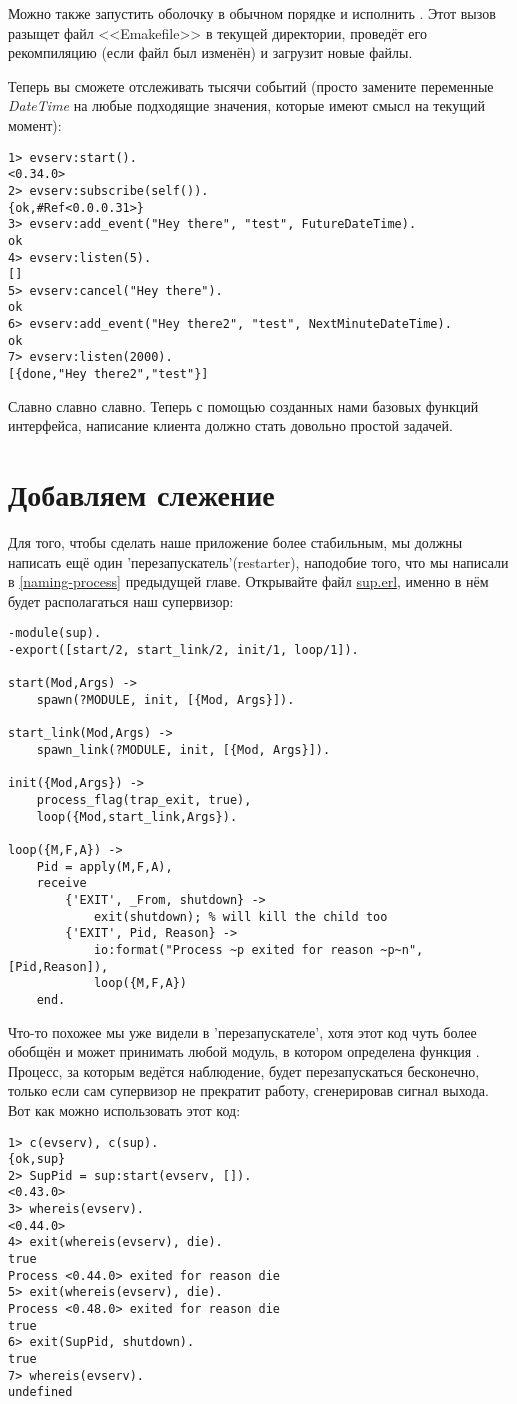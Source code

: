Можно также запустить оболочку в обычном порядке и исполнить .
Этот вызов разыщет файл <<Emakefile>> в текущей директории, проведёт его рекомпиляцию (если файл был изменён) и загрузит новые файлы.

Теперь вы сможете отслеживать тысячи событий (просто замените переменные \emph{DateTime} на любые подходящие значения, которые имеют смысл на текущий момент): 
\begin{lstlisting}[style=erlang]
1> evserv:start().
<0.34.0>
2> evserv:subscribe(self()).
{ok,#Ref<0.0.0.31>}
3> evserv:add_event("Hey there", "test", FutureDateTime).
ok
4> evserv:listen(5).
[]
5> evserv:cancel("Hey there").
ok
6> evserv:add_event("Hey there2", "test", NextMinuteDateTime).
ok
7> evserv:listen(2000).
[{done,"Hey there2","test"}]
\end{lstlisting}

Славно славно славно.
Теперь с помощью созданных нами базовых функций интерфейса, написание клиента должно стать довольно простой задачей.
\section{Добавляем слежение}
\label{adding-supervision}
Для того, чтобы сделать наше приложение более стабильным, мы должны написать ещё один 'перезапускатель'(restarter), наподобие того, что мы написали в \ref{naming-process} предыдущей главе.
Открывайте файл \href{http://learnyousomeerlang.com/static/erlang/sup.erl}{sup.erl}, именно в нём будет располагаться наш супервизор:
\begin{lstlisting}[style=erlang]
-module(sup).
-export([start/2, start_link/2, init/1, loop/1]).
 
start(Mod,Args) ->
    spawn(?MODULE, init, [{Mod, Args}]).
 
start_link(Mod,Args) ->
    spawn_link(?MODULE, init, [{Mod, Args}]).
 
init({Mod,Args}) ->
    process_flag(trap_exit, true),
    loop({Mod,start_link,Args}).
 
loop({M,F,A}) ->
    Pid = apply(M,F,A),
    receive
        {'EXIT', _From, shutdown} ->
            exit(shutdown); % will kill the child too
        {'EXIT', Pid, Reason} ->
            io:format("Process ~p exited for reason ~p~n",[Pid,Reason]),
            loop({M,F,A})
    end.
\end{lstlisting}

Что\--то похожее мы уже видели в 'перезапускателе', хотя этот код чуть более обобщён и может принимать любой модуль, в котором определена функция .
Процесс, за которым ведётся наблюдение, будет перезапускаться бесконечно, только если сам супервизор не прекратит работу, сгенерировав сигнал выхода.
Вот как можно использовать этот код:
\begin{lstlisting}[style=erlang]
1> c(evserv), c(sup).
{ok,sup}
2> SupPid = sup:start(evserv, []).
<0.43.0>
3> whereis(evserv).
<0.44.0>
4> exit(whereis(evserv), die).
true
Process <0.44.0> exited for reason die
5> exit(whereis(evserv), die).
Process <0.48.0> exited for reason die
true
6> exit(SupPid, shutdown).
true
7> whereis(evserv).
undefined
\end{lstlisting}

